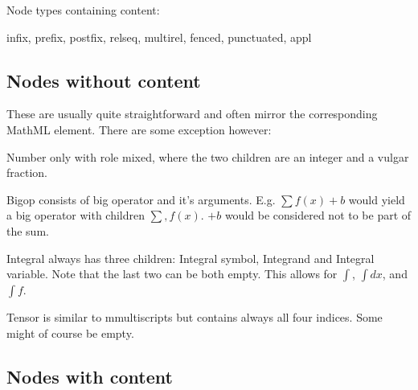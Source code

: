 \documentclass{article}
\begin{document}
Node types containing content: 

infix, prefix, postfix, relseq, multirel, fenced, punctuated, appl

\subsection{Nodes without content}

These are usually quite straightforward and often mirror the corresponding
MathML element. There are some exception however: 

Number only with role mixed, where the two children are an integer and a vulgar
fraction.

Bigop consists of big operator and it's arguments. E.g. $\sum f(x) + b$ would
yield a big operator with children $\sum, f(x)$. $+ b$ would be considered not
to be part of the sum.

Integral always has three children: Integral symbol, Integrand and Integral
variable. Note that the last two can be both empty. This allows for $\int$,
$\int dx$, and $\int f$.

Tensor is similar to mmultiscripts but contains always all four indices.  Some
might of course be empty.

\subsection{Nodes with content}
\end{document}
